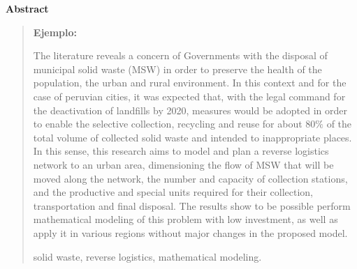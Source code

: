 \newpage
\begin{center}
 {\bf\LARGE Abstract}\vskip 1.5cm
\end{center} 
\begin{quotation}

{\bf Ejemplo:}\par

The literature reveals a concern of Governments with the disposal of municipal solid waste (MSW) in order to preserve the health of the population, the urban and rural environment. In this context and for the case of peruvian cities, it was expected that, with the legal command for the deactivation of landfills by 2020, measures would be adopted in order to enable the selective collection, recycling and reuse for about $80\%$ of the total volume of collected solid waste and intended to inappropriate places. 
\vskip 0.2cm
In this sense, this research aims to model and plan a reverse logistics network to an urban area, dimensioning the flow of MSW that will be moved along the network, the number and capacity of collection stations, and the productive and special units required for their collection, transportation and final disposal. The results show to be possible perform mathematical modeling of this problem with low investment, as well as apply it in various regions without major changes in the proposed model.

\vskip 0.3cm
\hspace*{-0.6cm}{\bf Keywords:} solid waste, reverse logistics, mathematical modeling.
\end{quotation}
